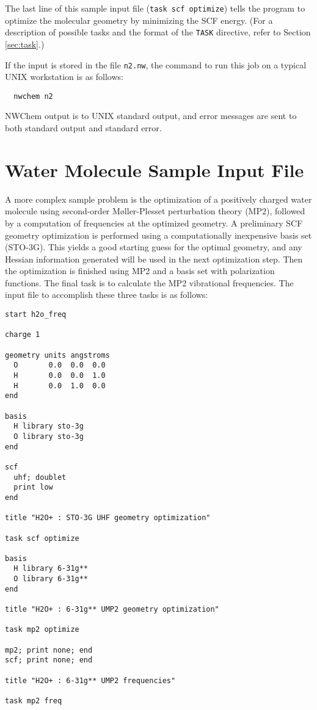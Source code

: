 The last line of this sample input file ({\tt task scf optimize})
tells the program to optimize the molecular geometry by minimizing
the SCF energy.  (For a description of possible tasks and the format
of the \verb+TASK+ directive, refer to Section \ref{sec:task}.)

If the input is stored in the file \verb+n2.nw+, the command to run
this job on a typical UNIX workstation is as follows:

\begin{verbatim}
  nwchem n2
\end{verbatim}

NWChem output is to UNIX standard output, and error messages are sent to
both standard output and standard error.

\section{Water Molecule Sample Input File}
\label{sec:realsample}

A more complex sample problem is the optimization of a positively
charged water molecule using second-order M{\o}ller-Plesset
perturbation theory (MP2), followed by a computation of frequencies at
the optimized geometry.  A preliminary SCF geometry optimization is
performed using a computationally inexpensive basis set (STO-3G).
This yields a good starting guess for the optimal geometry, and any
Hessian information generated will be used in the next optimization
step.  Then the optimization is finished using MP2 and a basis set
with polarization functions.  The final task is to calculate the
MP2 vibrational frequencies.  The input file to accomplish these three
tasks is as follows:

\begin{verbatim}
start h2o_freq

charge 1

geometry units angstroms
  O       0.0  0.0  0.0
  H       0.0  0.0  1.0
  H       0.0  1.0  0.0
end

basis
  H library sto-3g
  O library sto-3g
end

scf
  uhf; doublet
  print low
end

title "H2O+ : STO-3G UHF geometry optimization"

task scf optimize

basis
  H library 6-31g**
  O library 6-31g**
end

title "H2O+ : 6-31g** UMP2 geometry optimization"

task mp2 optimize

mp2; print none; end
scf; print none; end

title "H2O+ : 6-31g** UMP2 frequencies"

task mp2 freq
\end{verbatim}

